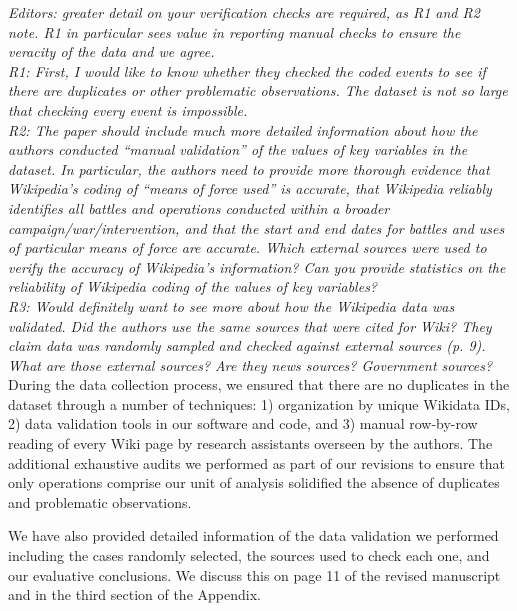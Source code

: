 \documentclass[fleqn,12pt]{article}
\begin{document}
\noindent
\textit{Editors: greater detail on your verification checks are required, as R1 and R2 note.  R1 in particular sees value in reporting manual checks to ensure the veracity of the data and we agree.} \\

\noindent
\textit{R1: First, I would like to know whether they checked the coded events to see if there are duplicates or other problematic observations. The dataset is not so large that checking every event is impossible.} \\

\noindent
\textit{R2: The paper should include much more detailed information about how the authors conducted “manual validation” of the values of key variables in the dataset. In particular, the authors need to provide more thorough evidence that Wikipedia’s coding of “means of force used” is accurate, that Wikipedia reliably identifies all battles and operations conducted within a broader campaign/war/intervention, and that the start and end dates for battles and uses of particular means of force are accurate. Which external sources were used to verify the accuracy of Wikipedia’s information? Can you provide statistics on the reliability of Wikipedia coding of the values of key variables?} \\

\noindent
\textit{R3: Would definitely want to see more about how the Wikipedia data was validated. Did the authors use the same sources that were cited for Wiki? They claim data was randomly sampled and checked against external sources (p. 9). What are those external sources? Are they news sources? Government sources?} \\

During the data collection process, we ensured that there are no duplicates in the dataset through a number of techniques: 1) organization by unique Wikidata IDs, 2) data validation tools in our software and code, and 3) manual row-by-row reading of every Wiki page by research assistants overseen by the authors. The additional exhaustive audits we performed as part of our revisions to ensure that only operations comprise our unit of analysis solidified the absence of duplicates and problematic observations.

We have also provided detailed information of the data validation we performed including the cases randomly selected, the sources used to check each one, and our evaluative conclusions. We discuss this on page 11 of the revised manuscript and in the third section of the Appendix. 
    
\end{document}
